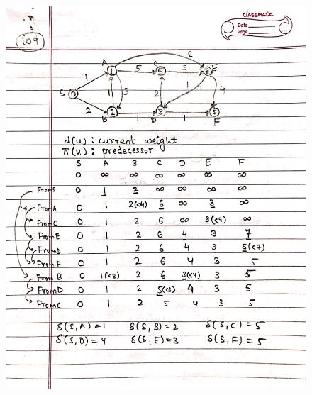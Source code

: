 \begin{figure}[H]
    \centering
    \includegraphics[scale=0.25]{"./MIT-6.006/MIT-6006-109"}
\end{figure}
\newpage
